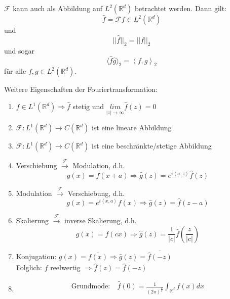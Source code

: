 \documentclass{article}
\theoremstyle{plain}
\theoremstyle{definition}
\numberwithin{equation}{section}
\newcommand{\norm}[1] {
\left|\left| #1 \right|\right|
}
\newcommand{\skprod}[2]{
\left \langle #1,#2 \right \rangle
}
\newcommand{\abs}[1] {
\left| #1 \right|
}
\newcommand{\R}[0] {
\mathbb R
}
\begin{document}
    $\mathcal F$ kann auch als Abbildung auf $L^2(\R^d)$ betrachtet werden. Dann gilt:\\
    \[\hat f = \mathcal F f \in L^2(\R^d)\]
    und
    \begin{equation}
        \bigl|\bigl|{\hat f}\bigr|\bigr|_2 = \norm{f}_2
    \end{equation}
    und sogar
    \begin{equation}
        \bigl\langle{\hat f}{\hat g} \bigr\rangle_2 = \skprod{f}{g}_2
    \end{equation}
    für alle $f,g \in L^2(\R^d)$.

    Weitere Eigenschaften der Fouriertransformation:

    \begin{enumerate}[label = \roman *)]
        \item $f \in L^1(\R^d) \Rightarrow \hat f$ stetig und $\underset{\abs{z} \to \infty}{lim} \hat f(z) = 0$
        \item $\mathcal F: L^1(\R^d) \to C(\R^d)$ ist eine lineare Abbildung
        \item $\mathcal F: L^1(\R^d) \to C(\R^d)$ ist eine beschränkte/stetige Abbildung
        \item Verschiebung $\overset{\mathcal F}{\to}$ Modulation, d.h.
        \begin{equation*}
            g(x) = f(x+a) \Rightarrow \hat g(z) = e^{i \skprod{a}{z}} \hat f(z)
        \end{equation*}
        \item Modulation $\overset{\mathcal F}{\to}$ Verschiebung, d.h.
        \begin{equation*}
            g(x) = e^{i \skprod{x}{a}} f(x) \Rightarrow \hat g(z)= \hat f(z-a)
        \end{equation*}
        \item Skalierung $\overset{\mathcal F}{\to}$ inverse Skalierung, d.h.
        \begin{equation*}
            g(x)=f(cx) \Rightarrow \hat g(z) = \frac{1}{\abs c} \hat f\left(\frac{z}{\abs c}\right)
        \end{equation*}
        \item Konjugation: $g(x) = \overline{f(x)} \Rightarrow \hat g(z) = \overline{\hat f (-z)}$\\
        Folglich: $f$ reelwertig $\Rightarrow \hat f(z) = \overline{\hat f(-z)}$
        \item
        \begin{align*}
            \text{Grundmode:} \ & \displaystyle \hat f(0) = \frac{1}{(2 \pi )^\frac{d}{2}} \int_{\R^d} f(x) dx\\

\end{align*}
\end{enumerate}
\end{document}
